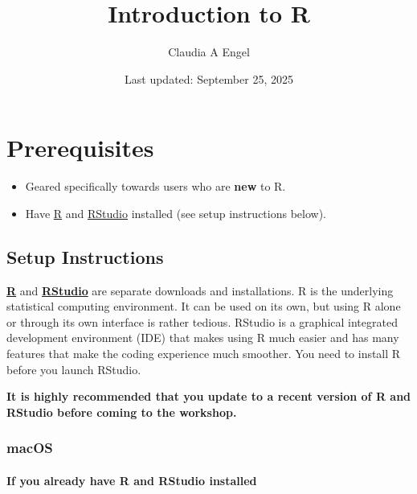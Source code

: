 \documentclass[
]{book}
\title{Introduction to R}
\author{Claudia A Engel}
\date{Last updated: September 25, 2025}
\providecommand{\tightlist}{%
  \setlength{\itemsep}{0pt}\setlength{\parskip}{0pt}}
\begin{document}
\maketitle

{
\setcounter{tocdepth}{1}
\tableofcontents
}
\chapter*{Prerequisites}\label{prerequisites}

\begin{itemize}
\tightlist
\item
  Geared specifically towards users who are \textbf{new} to R.\\
\item
  Have \href{https://cran.r-project.org/}{R} and \href{https://posit.co/download/rstudio-desktop/}{RStudio} installed (see setup instructions below).
\end{itemize}

\section*{Setup Instructions}\label{setup-instructions}

\href{https://cran.r-project.org/}{\textbf{R}} and \href{https://posit.co/download/rstudio-desktop/}{\textbf{RStudio}} are separate downloads and installations. R is the underlying statistical computing environment. It can be used on its own, but using R alone or through its own interface is rather tedious. RStudio is a graphical integrated development environment (IDE) that makes using R much easier and has many features that make the coding experience much smoother. You need to install R before you launch RStudio.

\textbf{It is highly recommended that you update to a recent version of R and RStudio before coming to the workshop.}

\subsection*{macOS}\label{macos}

\subsubsection*{If you already have R and RStudio installed}\label{if-you-already-have-r-and-rstudio-installed}
\end{document}
